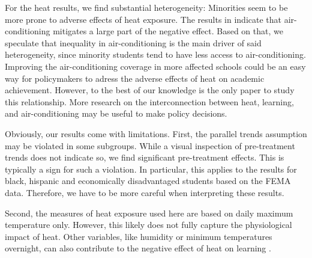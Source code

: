 For the heat results, we find substantial heterogeneity: Minorities seem to be more prone to adverse effects of heat exposure. The results in \cite{Goodman_2020} indicate that air-conditioning mitigates a large part of the negative effect. Based on that, we speculate that inequality in air-conditioning is the main driver of said heterogeneity, since minority students tend to have less access to air-conditioning. Improving the air-conditioning coverage in more affected schools could be an easy way for policymakers to adress the adverse effects of heat on academic achievement. However, to the best of our knowledge \cite{Goodman_2020} is the only paper to study this relationship. More research on the interconnection between heat, learning, and air-conditioning may be useful to make policy decisions.

Obviously, our results come with limitations. First, the parallel trends assumption may be violated in some subgroups. While a visual inspection of pre-treatment trends does not indicate so, we find significant pre-treatment effects. This is typically a sign for such a violation. In particular, this applies to the results for black, hispanic and economically disadvantaged students based on the FEMA data. Therefore, we have to be more careful when interpreting these results.

Second, the measures of heat exposure used here are based on daily maximum temperature only. However, this likely does not fully capture the physiological impact of heat. Other variables, like humidity or minimum temperatures overnight, can also contribute to the negative effect of heat on learning \citep[for an extensive discussion of heat exposure measurement see][]{Rennie_2021}.


